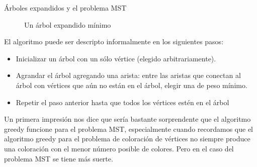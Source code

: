 \begin{section}{Árboles expandidos y el problema MST}
\begin{figure}[ht]
    \begin{center}
    \end{center}
    \caption{Un árbol expandido mínimo} \label{f6.4}
\end{figure}

El  algoritmo puede ser descripto informalmente en los siguientes pasos:
\begin{itemize}
\item Inicializar un árbol con un sólo vértice (elegido arbitrariamente).
\item Agrandar el árbol agregando una arista: entre las aristas que conectan al árbol con vértices que aún no están en el árbol, elegir una de peso mínimo.
\item Repetir el paso anterior hasta que todos los vértices estén en el árbol
\end{itemize}

Un primera impresión nos dice que sería bastante sorprendente que el algoritmo greedy funcione para el problema MST, especialmente cuando recordamos que el algoritmo greedy para el problema de coloración de vértices no siempre produce una coloración con el menor número posible de co\-lo\-res. Pero en el caso del problema MST se tiene más suerte.


\end{section}
